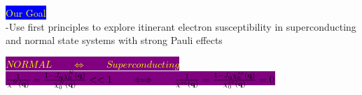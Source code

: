 \documentclass{beamer}
\begin{document}
\begin{frame}
  \colorbox{blue}{\textcolor{yellow}{Our Goal}} \\
-Use first principles to explore itinerant electron susceptibility in superconducting and normal state systems with strong Pauli effects \\

  
\begin{center}
\hspace{1.25cm}\colorbox{purple}{\textcolor{yellow}{$NORMAL \quad\quad\Longleftrightarrow\quad\quad Superconducting$}}  \\
 \colorbox{purple}{\textcolor{yellow}{$\frac{1}{\chi^{N}({\bf q})}=\frac{1-J_{\bf q}\chi^N_0({\bf q})}{\chi^N_0({\bf q})} <<1 \quad\quad\Longleftrightarrow\quad\quad\frac{1}{\chi^{sc}({\bf q})}=\frac{1-J_{\bf q}\chi^{sc}_0({\bf q})}{\chi^{sc}_0({\bf q})} =0$}}  
 \end{center}
 
\end{frame}
\end{document}
